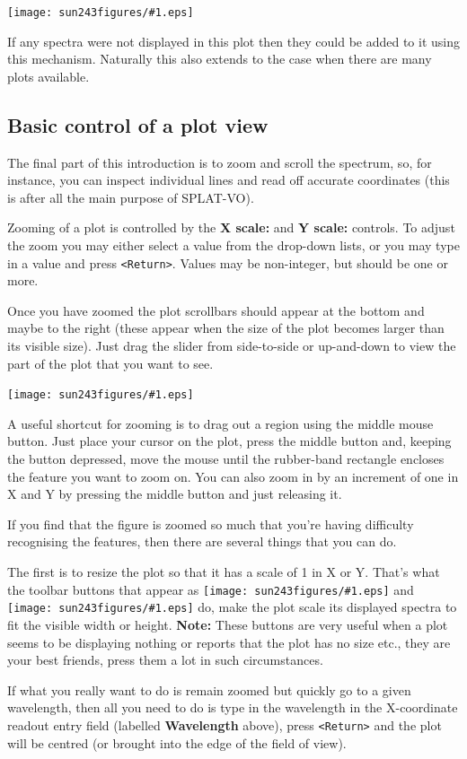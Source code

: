 \documentclass[twoside,11pt]{article}
\newcommand{\htmladdimg}[1]{}
\newcommand{\latexhtml}[2]{#1}
\newcommand{\xlabel}[1]{}
\renewcommand{\_}{\texttt{\symbol{95}}}
\newcommand{\SPLAT}{\textsf{SPLAT-VO}}
\newcommand{\mainfigure}[1]
{\begin{center}
 \latexhtml{\texttt{[image: sun243\_figures/\#1.eps]}}{\htmladdimg{#1.gif}}
 \end{center}
}
\newcommand{\inline}[1]
        {\latexhtml{\texttt{[image: sun243\_figures/\#1.eps]}}
        {\htmladdimg[align=center]{#1.gif}}}
\newcommand{\labelitem}[1]{\textbf{#1}}
\newcommand{\hitext}[1]{\texttt{#1}}
\begin{document}
\mainfigure{browser4}

If any spectra were not displayed in this plot then they could be
added to it using this mechanism. Naturally this also extends to the
case when there are many plots available.

\newpage
\subsection{Basic control of a plot view\xlabel{basic_control}}

The final part of this introduction is to zoom and scroll the
spectrum, so, for instance, you can inspect individual lines and read
off accurate coordinates (this is after all the main purpose of
\SPLAT).

Zooming of a plot is controlled by the \labelitem{X scale:} and
\labelitem{Y scale:} controls. To adjust the zoom you may either select a
value from the drop-down lists, or you may type in a value and press
\hitext{<Return>}. Values may be non-integer, but should be one or more.

Once you have zoomed the plot scrollbars should appear at the bottom
and maybe to the right (these appear when the size of the plot becomes
larger than its visible size). Just drag the slider from side-to-side
or up-and-down to view the part of the plot that you want to see.

\mainfigure{plot4}

A useful shortcut for zooming is to drag out a region using the middle
mouse button. Just place your cursor on the plot, press the middle
button and, keeping the button depressed, move the mouse until the
rubber-band rectangle encloses the feature you want to zoom on. You
can also zoom in by an increment of one in X and Y by pressing the
middle button and just releasing it.

If you find that the figure is zoomed so much that you're having
difficulty recognising the features, then there are several things
that you can do.

The first is to resize the plot so that it has a scale of 1 in X or
Y. That's what the toolbar buttons that appear as
\inline{fitwidth} and \inline{fitheight} do, make the plot scale its
displayed spectra to fit the visible width or height.
\textbf{Note:} These buttons are very useful when a plot seems to be
displaying nothing or reports that the plot has no size etc., they are your
best friends, press them a lot in such circumstances.

If what you really want to do is remain zoomed but quickly go to a
given wavelength, then all you need to do is type in the wavelength in
the X-coordinate readout entry field (labelled \labelitem{Wavelength}
above), press \hitext{<Return>} and the plot will be centred (or
brought into the edge of the field of view).
\end{document}
